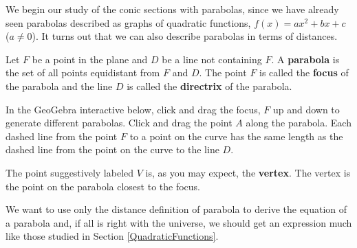 \documentclass{ximera}
\begin{document}
	\author{Stitz-Zeager}




\setcounter{footnote}{0}

\label{Parabolas}

We begin our study of the conic sections with parabolas, since we have already seen parabolas described as graphs of quadratic functions,  $f(x) = ax^2 + bx + c$ ($a \neq 0$).  It turns out that we can also describe parabolas in terms of distances.

 


\begin{definition}

\label{paraboladefn}

Let $F$ be a point in the plane and $D$ be a line not containing $F$.   A   \textbf{parabola} is the set of all points equidistant from $F$ and $D$.  The point $F$ is called the \textbf{focus}   of the parabola and the line $D$ is called the \textbf{directrix}   of the parabola. 

\end{definition}




In the GeoGebra interactive below, click and drag the focus, $F$ up and down to generate different parabolas.  Click and drag the point $A$ along the parabola. Each dashed line from the point $F$ to a point on the curve has the same length as the dashed line from the point on the curve to the line $D$.

\begin{center}
\end{center}

  The point suggestively labeled $V$ is, as you may expect, the \textbf{vertex}.  The   vertex is the point on the parabola closest to the focus.  

 

We want to use only the distance definition of parabola to derive the equation of a parabola and, if all is right with the universe, we should get an expression much like those studied in Section \ref{QuadraticFunctions}.  
\end{document}
